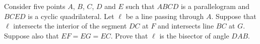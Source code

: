 Consider five points $A$, $B$, $C$, $D$ and $E$
such that $ABCD$ is a parallelogram and $BCED$ is a cyclic quadrilateral.
Let $\ell$ be a line passing through $A$.
Suppose that $\ell$ intersects the interior of the segment $DC$ at $F$
and intersects line $BC$ at $G$.
Suppose also that $EF = EG = EC$.
Prove that $\ell$ is the bisector of angle $ DAB$.